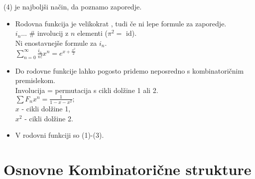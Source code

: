 \documentclass[a4paper, 12pt]{book}
\theoremstyle{definition}
\theoremstyle{remark}
\begin{document}
%
(4) je najboljši način, da poznamo zaporedje.

\begin{itemize}[label={--}]
  \item Rodovna funkcija je velikokrat , tudi če ni lepe formule za zaporedje. \\
    $i_n \dots$ \# involucij z $n$ elementi ($\pi^2 = $ id). \\
    Ni enostavnejše formule za $i_n$. \\
    $\sum_{n=0}^{\infty} \frac{i_n}{n!} x^n = e^{x + \frac{x^2}{2}}$
  \item Do rodovne funkcije lahko pogosto pridemo neposredno s kombinatoričnim premislekom. \\
    Involucija = permutacija s cikli dolžine 1 ali 2. \\
    $\sum F_n x^n = \frac{1}{1-x-x^2};$ \\
    $x$ - cikli dolžine 1, \\
    $x^2$ - cikli dolžine 2.
  \item V rodovni funkciji so  (1)-(3).
\end{itemize}


\section{Osnovne Kombinatorične strukture}
\end{document}

